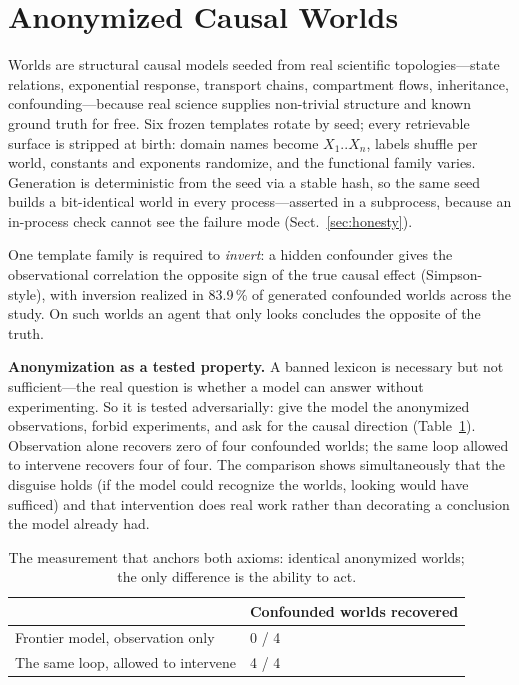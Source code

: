 \documentclass{llncs}
\begin{document}
\section{Anonymized Causal Worlds}\label{sec:worlds}

Worlds are structural causal models seeded from real scientific
topologies---state relations, exponential response, transport chains,
compartment flows, inheritance, confounding---because real science supplies
non-trivial structure and known ground truth for free. Six frozen templates
rotate by seed; every retrievable surface is stripped at birth: domain names
become $X_1..X_n$, labels shuffle per world, constants and exponents
randomize, and the functional family varies. Generation is deterministic from
the seed via a stable hash, so the same seed builds a bit-identical world in
every process---asserted in a subprocess, because an in-process check cannot
see the failure mode (Sect.~\ref{sec:honesty}).

One template family is required to \emph{invert}: a hidden confounder gives
the observational correlation the opposite sign of the true causal effect
(Simpson-style), with inversion realized in 83.9\,\% of generated confounded
worlds across the study. On such worlds an agent that only looks concludes
the opposite of the truth.

\textbf{Anonymization as a tested property.} A banned lexicon is necessary
but not sufficient---the real question is whether a model can answer without
experimenting. So it is tested adversarially: give the model the anonymized
observations, forbid experiments, and ask for the causal direction
(Table~\ref{tab:blind}). Observation alone recovers zero of four confounded
worlds; the same loop allowed to intervene recovers four of four. The
comparison shows simultaneously that the disguise holds (if the model could
recognize the worlds, looking would have sufficed) and that intervention does
real work rather than decorating a conclusion the model already had.

\begin{table}
\caption{The measurement that anchors both axioms: identical anonymized
worlds; the only difference is the ability to act.}\label{tab:blind}
\centering
\begin{tabular}{@{}ll@{}}
\toprule
 & Confounded worlds recovered\\
\midrule
Frontier model, observation only & 0 / 4\\
The same loop, allowed to intervene & 4 / 4\\
\bottomrule
\end{tabular}
\end{table}
\end{document}
